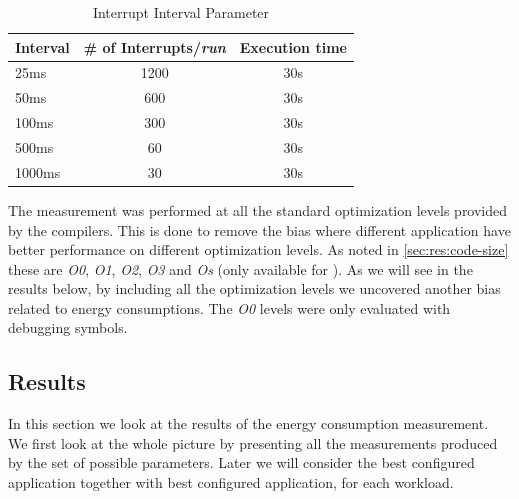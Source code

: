\begin{table}[H]
  \centering
  \begin{tabular}{l | c | c}
    \textbf{Interval} & \textbf{\# of Interrupts/\emph{run}} & \textbf{Execution time} \\
    \hline
    25ms & 1200 & 30s \\
    50ms & 600 & 30s \\
    100ms & 300 & 30s \\
    500ms & 60 & 30s \\
    1000ms & 30 & 30s \\
    \hline
  \end{tabular}
  \caption{Interrupt Interval Parameter}
  \label{tab:res:energy:parameters}
\end{table}

The measurement was performed at all the standard optimization levels provided by the compilers.
This is done to remove the bias where different application have better performance on different optimization levels.
As noted in \autoref{sec:res:code-size} these are \emph{O0}, \emph{O1}, \emph{O2}, \emph{O3} and \emph{Os} (only available for {\C}).
As we will see in the results below, by including all the optimization levels we uncovered another bias related to energy consumptions.
The \emph{O0} levels were only evaluated with debugging symbols.

\subsection{Results}

In this section we look at the results of the energy consumption measurement.
We first look at the whole picture by presenting all the measurements produced by the set of possible parameters.
Later we will consider the best configured {\C} application together with best configured {\rust} application, for each workload.

